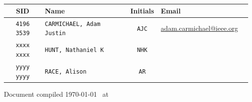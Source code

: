 \begin{titlepage}
\begin{center}

\textsc{\LARGE \MyInstitution }\\[1.5cm]
\HRule \\[0.9cm]

{ \huge \bfseries \MyTitle }\\[0.4cm] \HRule \\[1.5cm]

\vfill

\begin{tabularx}{\linewidth}{ c X c X X }
\hline
  SID & Name & Initials & Email \\
  \hline
  \texttt{4196 3539} & \texttt{CARMICHAEL, Adam Justin}  & \texttt{AJC} & \url{adam.carmichael@ieee.org} \\
  \texttt{xxxx xxxx} & \texttt{HUNT, Nathaniel K} & \texttt{NHK} & \\
  \texttt{yyyy yyyy} & \texttt{RACE, Alison} & \texttt{AR} & \\
\end{tabularx}

\vspace{1cm}
\small{Document compiled \today ~ at \currenttime}
\end{center}

\end{titlepage}
